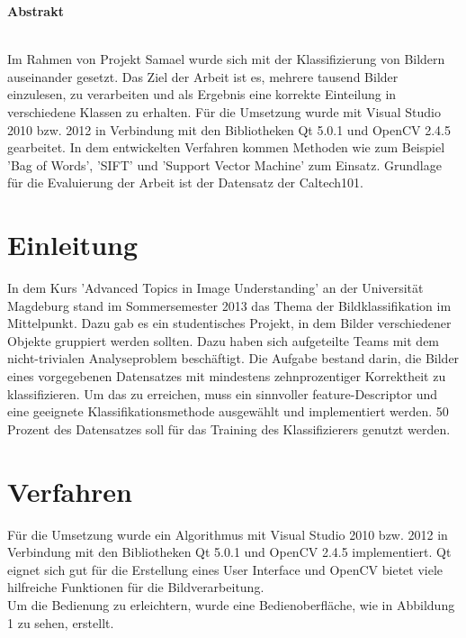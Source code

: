 \documentclass[liststotoc,11pt,a4paper]{article}
\begin{document}
\thispagestyle{empty}
\newpage
\tableofcontents                %
\setcounter{page}{1}
\newpage

\Large \bfseries Abstrakt\\
\normalsize \mdseries
{}
\normalfont
\\Im Rahmen von Projekt Samael wurde sich mit der Klassifizierung von Bildern auseinander gesetzt. Das Ziel der Arbeit ist es, mehrere tausend Bilder einzulesen, zu verarbeiten und als Ergebnis eine korrekte Einteilung in verschiedene Klassen zu erhalten. Für die Umsetzung wurde mit Visual Studio 2010 bzw. 2012 in Verbindung mit den Bibliotheken Qt 5.0.1 und OpenCV 2.4.5 gearbeitet. In dem entwickelten Verfahren kommen Methoden wie zum Beispiel 'Bag of Words', 'SIFT' und 'Support Vector Machine' zum Einsatz. %
Grundlage für die Evaluierung der Arbeit ist der Datensatz der Caltech101. 

\section{Einleitung}
In dem Kurs 'Advanced Topics in Image Understanding' an der Universität Magdeburg stand im Sommersemester 2013 das Thema der Bildklassifikation im Mittelpunkt. Dazu gab es ein studentisches Projekt, in dem Bilder verschiedener Objekte gruppiert werden sollten. Dazu haben sich aufgeteilte Teams mit dem nicht-trivialen Analyseproblem beschäftigt. Die Aufgabe bestand darin, die Bilder eines vorgegebenen Datensatzes mit mindestens zehnprozentiger Korrektheit zu klassifizieren. 
Um das zu erreichen, muss ein sinnvoller feature-Descriptor und eine geeignete Klassifikationsmethode ausgewählt und implementiert werden. 50 Prozent des Datensatzes soll für das Training des Klassifizierers genutzt werden.

\section{Verfahren}
Für die Umsetzung wurde ein Algorithmus mit Visual Studio 2010 bzw. 2012 in Verbindung mit den Bibliotheken Qt 5.0.1 und OpenCV 2.4.5 implementiert. Qt eignet sich gut für die Erstellung eines User Interface und OpenCV bietet viele hilfreiche Funktionen für die Bildverarbeitung.\\Um die Bedienung zu erleichtern, wurde eine Bedienoberfläche, wie in Abbildung 1 zu sehen, erstellt.
\end{document}
